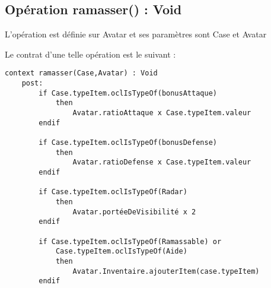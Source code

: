 
\subsection{Opération ramasser() : Void}
\label{sec:question18}

L'opération est définie sur Avatar et ses paramètres sont Case et Avatar

Le contrat d'une telle opération est le suivant :

\begin{lstlisting}[caption=Contrat \textsc{Ocl} sur l'opération ramasser,captionpos=b,label={lst:ramasser},language=OCL]
context ramasser(Case,Avatar) : Void
    post:
        if Case.typeItem.oclIsTypeOf(bonusAttaque)
            then
                Avatar.ratioAttaque x Case.typeItem.valeur
        endif

        if Case.typeItem.oclIsTypeOf(bonusDefense)
            then
                Avatar.ratioDefense x Case.typeItem.valeur
        endif

        if Case.typeItem.oclIsTypeOf(Radar)
            then
                Avatar.portéeDeVisibilité x 2
        endif

        if Case.typeItem.oclIsTypeOf(Ramassable) or
            Case.typeItem.oclIsTypeOf(Aide)
            then
                Avatar.Inventaire.ajouterItem(case.typeItem)
        endif
\end{lstlisting}
